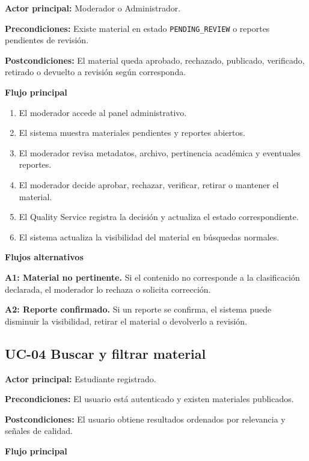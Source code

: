 \documentclass[12pt,a4paper]{article}
\begin{document}
\noindent\textbf{Actor principal:} Moderador o Administrador.

\noindent\textbf{Precondiciones:} Existe material en estado \texttt{PENDING\_REVIEW} o reportes pendientes de revisión.

\noindent\textbf{Postcondiciones:} El material queda aprobado, rechazado, publicado, verificado, retirado o devuelto a revisión según corresponda.

\noindent\textbf{Flujo principal}

\begin{enumerate}
    \item El moderador accede al panel administrativo.
    \item El sistema muestra materiales pendientes y reportes abiertos.
    \item El moderador revisa metadatos, archivo, pertinencia académica y eventuales reportes.
    \item El moderador decide aprobar, rechazar, verificar, retirar o mantener el material.
    \item El Quality Service registra la decisión y actualiza el estado correspondiente.
    \item El sistema actualiza la visibilidad del material en búsquedas normales.
\end{enumerate}

\noindent\textbf{Flujos alternativos}

\noindent\textbf{A1: Material no pertinente.} Si el contenido no corresponde a la clasificación declarada, el moderador lo rechaza o solicita corrección.

\noindent\textbf{A2: Reporte confirmado.} Si un reporte se confirma, el sistema puede disminuir la visibilidad, retirar el material o devolverlo a revisión.

\subsection{UC-04 Buscar y filtrar material}

\noindent\textbf{Actor principal:} Estudiante registrado.

\noindent\textbf{Precondiciones:} El usuario está autenticado y existen materiales publicados.

\noindent\textbf{Postcondiciones:} El usuario obtiene resultados ordenados por relevancia y señales de calidad.

\noindent\textbf{Flujo principal}
\end{document}

